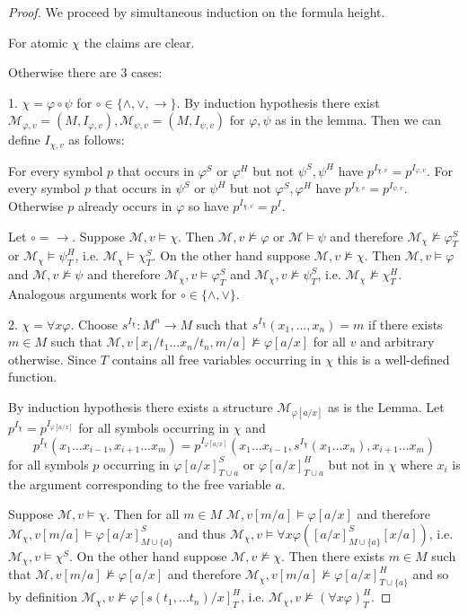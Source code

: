 \documentclass[a4paper,UKenglish,cleveref, autoref, thm-restate]{lipics-v2021}
\begin{document}
\begin{proof}
	We proceed by simultaneous induction on the formula height.
	
	For atomic $\chi$ the claims are clear.
	
	Otherwise there are $3$ cases:
	
	1. $\chi = \varphi\circ\psi$ for $\circ\in\{\wedge,\vee,\to\}$. By induction hypothesis there exist $\mathcal M_{\varphi, v} = (M, I_{\varphi, v}), \mathcal M_{\psi, v} = (M, I_{\psi, v})$ for $\varphi,\psi$ as in the lemma. Then we can define $I_{\chi, v}$ as follows:
	
	For every symbol $p$ that occurs in $\varphi^S$ or $\varphi^H$ but not $\psi^S, \psi^H$ have $p^{I_{\chi, v}} = p^{I_{\varphi, v}}$. For every symbol $p$ that occurs in $\psi^S$ or $\psi^H$ but not $\varphi^S, \varphi^H$ have $p^{I_{\chi, v}} = p^{I_{\psi, v}}$. Otherwise $p$ already occurs in $\varphi$ so have $p^{I_{\chi, v}} = p^I$.
	
	Let $\circ=\to$. Suppose $\mathcal M, v\models\chi$. Then $\mathcal M, v\not\models\varphi$ or $\mathcal M\models\psi$ and therefore $\mathcal M_\chi\not\models\varphi^S_T$ or $\mathcal M_\chi\models\psi^H_T$, i.e. $\mathcal M_\chi\models\chi^S_T$. On the other hand suppose $\mathcal M, v\not\models\chi$. Then $\mathcal M, v\models\varphi$ and $\mathcal M, v\not\models\psi$ and therefore $\mathcal M_\chi, v\models \varphi^S_T$ and $\mathcal M_\chi, v\not\models\psi^S_T$, i.e. $\mathcal M_\chi\not\models\chi^H_T$. Analogous arguments work for $\circ\in\{\wedge, \vee\}$.
	
	2. $\chi = \forall x\varphi$. Choose $s^{I_\chi}:M^n\to M$ such that $s^{I_\chi}(x_1,\dots, x_n) = m$ if there exists $m\in M$ such that $\mathcal M, v[x_1/t_1\dots x_n/t_n, m/a]\not\models\varphi[a/x]$ for all $v$ and arbitrary otherwise. Since $T$ contains all free variables occurring in $\chi$ this is a well-defined function.
	
	By induction hypothesis there exists a structure $\mathcal M_{\varphi[a/x]}$ as is the Lemma. Let $p^{I_\chi} = p^{I_{\varphi[a/x]}}$ for all symbols occurring in $\chi$ and $$p^{I_\chi}(x_1\dots x_{i-1}, x_{i+1}\dots x_m) = p^{I_{\varphi[a/x]}}(x_1\dots x_{i-1}, s^{I_\chi}(x_1\dots x_n), x_{i+1}\dots x_m)$$ for all symbols $p$ occurring in $\varphi[a/x]^S_{T\cup a}$ or $\varphi[a/x]^H_{T\cup a}$ but not in $\chi$ where $x_i$ is the argument corresponding to the free variable $a$.
	
	Suppose $\mathcal M, v\models\chi$. Then for all $m\in M$ $\mathcal M, v[m/a]\models\varphi[a/x]$ and therefore $\mathcal M_{\chi}, v[m/a]\models\varphi[a/x]^S_{M\cup\{a\}}$ and thus $\mathcal M_{\chi}, v\models \forall x\varphi([a/x]^S_{M\cup\{a\}}[x/a])$, i.e. $\mathcal M_\chi,v\models \chi^S$. On the other hand suppose $\mathcal M, v\not\models\chi$. Then there exists $m\in M$ such that $\mathcal M, v[m/a]\not\models\varphi[a/x]$ and therefore $\mathcal M_\chi, v[m/a]\not\models\varphi[a/x]^H_{T\cup\{a\}}$ and so by definition $\mathcal M_\chi, v\not\models\varphi[s(t_1,\dots t_n)/x]^H_T$, i.e. $\mathcal M_\chi, v\not\models(\forall x\varphi)^H_T$.
	

\end{proof}
\end{document}
